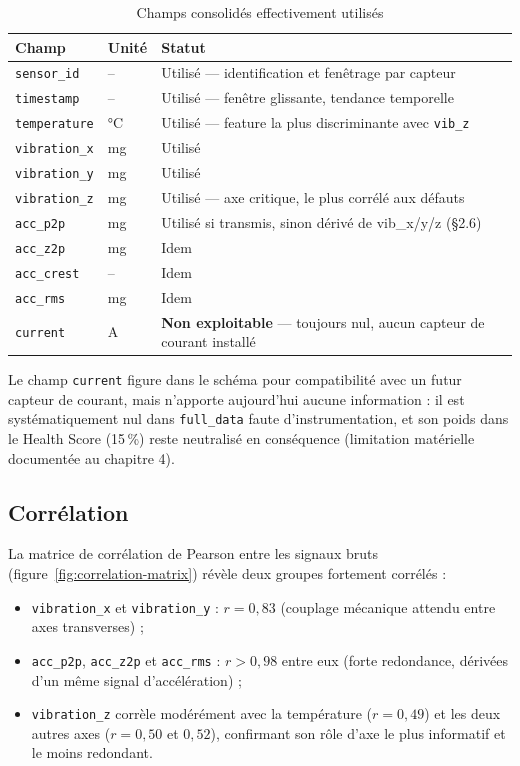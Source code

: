 \documentclass[12pt,a4paper]{report}
\begin{document}
\begin{table}[H]
\centering
\caption{Champs consolidés effectivement utilisés}
\begin{tabular}{lll}
\toprule
\textbf{Champ} & \textbf{Unité} & \textbf{Statut} \\
\midrule
\texttt{sensor\_id}   & --  & Utilisé --- identification et fenêtrage par capteur \\
\texttt{timestamp}    & --  & Utilisé --- fenêtre glissante, tendance temporelle \\
\texttt{temperature}  & °C  & Utilisé --- feature la plus discriminante avec \texttt{vib\_z} \\
\texttt{vibration\_x} & mg  & Utilisé \\
\texttt{vibration\_y} & mg  & Utilisé \\
\texttt{vibration\_z} & mg  & Utilisé --- axe critique, le plus corrélé aux défauts \\
\texttt{acc\_p2p}     & mg  & Utilisé si transmis, sinon dérivé de vib\_x/y/z (§2.6) \\
\texttt{acc\_z2p}     & mg  & Idem \\
\texttt{acc\_crest}   & --  & Idem \\
\texttt{acc\_rms}     & mg  & Idem \\
\texttt{current}      & A   & \textbf{Non exploitable} --- toujours nul, aucun capteur de courant installé \\
\bottomrule
\end{tabular}
\end{table}

Le champ \texttt{current} figure dans le schéma pour compatibilité avec un futur capteur de
courant, mais n'apporte aujourd'hui aucune information : il est systématiquement nul dans
\texttt{full\_data} faute d'instrumentation, et son poids dans le Health Score (15\,\%) reste
neutralisé en conséquence (limitation matérielle documentée au chapitre 4).

\subsection{Corrélation}

La matrice de corrélation de Pearson entre les signaux bruts (figure~\ref{fig:correlation-matrix}) révèle deux groupes fortement corrélés :

\begin{itemize}
  \item \texttt{vibration\_x} et \texttt{vibration\_y} : $r = 0{,}83$ (couplage mécanique attendu entre axes transverses) ;
  \item \texttt{acc\_p2p}, \texttt{acc\_z2p} et \texttt{acc\_rms} : $r > 0{,}98$ entre eux (forte redondance, dérivées d'un même signal d'accélération) ;
  \item \texttt{vibration\_z} corrèle modérément avec la température ($r = 0{,}49$) et les deux autres axes ($r = 0{,}50$ et $0{,}52$), confirmant son rôle d'axe le plus informatif et le moins redondant.
\end{itemize}
\end{document}
